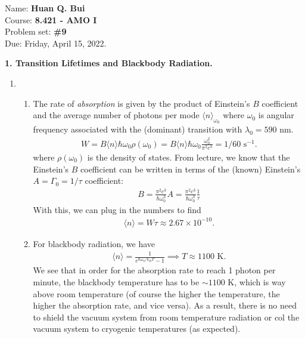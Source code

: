 \documentclass{article}
\theoremstyle{definition}
\newcommand{\f}[2]{\frac{#1}{#2}}
\begin{document}
\begin{framed}
\noindent Name: \textbf{Huan Q. Bui}\\
Course: \textbf{8.421 - AMO I}\\
Problem set: \textbf{\#9}\\
Due: Friday, April 15, 2022.
\end{framed}



\textbf{1. Transition Lifetimes and Blackbody Radiation. }

\begin{enumerate}[label=(\alph*)]
	\item 
	
	\begin{enumerate}[label=(\roman*)]
		\item The rate of \textit{absorption} is given by the product of Einstein's $B$ coefficient and the average number of photons per mode $\langle n \rangle_{\omega_0}$ where $\omega_0$ is angular frequency associated with the (dominant) transition with $\lambda_0 = 590$ nm. 
		\begin{align*}
		W = B\langle n \rangle \hbar \omega_0 \rho(\omega_0) = B\langle n \rangle \hbar \omega_0 \f{\omega_0^2}{\pi^2 c^3}   = 1/60 \text{ s}^{-1}.
		\end{align*} 
	where $\rho(\omega_0)$ is the density of states. From lecture, we know that the Einstein's $B$ coefficient can be written in terms of the (known) Einstein's $A = \Gamma_0 = 1/\tau$ coefficient:
		\begin{align*}
		B = \f{\pi^2 c^3}{\hbar \omega_0^3}A = \f{\pi^2 c^3}{\hbar \omega_0^3}\f{1}{\tau}
		\end{align*}
		With this, we can plug in the numbers to find 
		\begin{align*}
		\langle n \rangle = W \tau  \approx 2.67 \times 10^{-10}.
		\end{align*}
		
		
		
		\item For blackbody radiation, we have
		\begin{align*}
		\langle n \rangle = \f{1}{e^{\hbar \omega_0 / k_BT} - 1} \implies T\approx 1100 \text{ K}.
		\end{align*}
		We see that in order for the absorption rate to reach 1 photon per minute, the blackbody temperature has to be $\sim 1100$ K, which is way above room temperature (of course the higher the temperature, the higher the absorption rate, and vice versa). As a result, there is no need to shield the vacuum system from room temperature radiation or col the vacuum system to cryogenic temperatures (as expected).
	\end{enumerate}
	

\end{enumerate}
\end{document}
